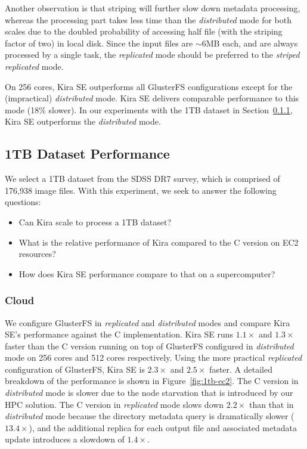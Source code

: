\documentclass[conference]{IEEEtran}
\begin{document}
Another observation is that striping will further slow down metadata processing, whereas the
processing part takes less time than the \emph{distributed} mode for both scales due
to the doubled probability of accessing half file (with the striping factor of two) in local disk.
Since the input files are $\sim$6MB each, and are always processed by a single task, the
\emph{replicated} mode should be preferred to the \emph{striped replicated} mode.

On 256 cores, Kira SE outperforms all GlusterFS configurations except for the (impractical) \emph{distributed}
mode. Kira SE delivers comparable performance to this mode (18\% slower). In our
experiments with the 1TB dataset in Section~\ref{sec:1TB-EC2}, Kira SE outperforms
the \emph{distributed} mode.

\subsection{1TB Dataset Performance}
\label{sec:Performance-1TB}

We select a 1TB dataset from the SDSS DR7 survey, which is comprised of 176,938 image files. 
With this experiment, we seek to answer the following questions: 

\begin{itemize}
\item Can Kira scale to process a 1TB dataset?
\item What is the relative performance of Kira compared to the C version on EC2 resources?
\item How does Kira SE performance compare to that on a supercomputer?
\end{itemize}

\subsubsection{Cloud}
\label{sec:1TB-EC2}

We configure GlusterFS in \emph{replicated} and \emph{distributed} modes and compare Kira
SE's performance against the C implementation. Kira SE runs $1.1\times$ and $1.3\times$ faster than the C version running on top of
GlusterFS configured in \emph{distributed} mode on 256 cores and 512 cores respectively. 
Using the more practical \emph{replicated} configuration of GlusterFS, Kira SE
is $2.3\times$ and $2.5\times$ faster. A detailed breakdown of the performance is shown in Figure~\ref{fig:1tb-ec2}.
The C version in \emph{distributed} mode is slower due to the node starvation that is introduced by our HPC solution.
The C version in \emph{replicated} mode slows down $2.2\times$ than that in \emph{distributed} mode because the directory metadata query
is dramatically slower ($13.4\times$), and the additional replica for each output file and associated metadata update introduces a slowdown
of $1.4\times$.
\end{document}
